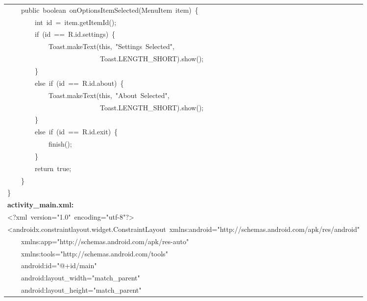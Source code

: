 \documentclass[a4paper,12pt]{article}
\begin{document}
\begin{longtable}{|p{}|}
{\ttfamily\small \ \ \ \ public\ boolean\ onOptionsItemSelected(MenuItem\ item)\ \{} \\
{\ttfamily\small \ \ \ \ \ \ \ \ int\ id\ =\ item.getItemId();} \\
{\ttfamily\small \ \ \ \ \ \ \ \ if\ (id\ ==\ R.id.settings)\ \{} \\
{\ttfamily\small \ \ \ \ \ \ \ \ \ \ \ \ Toast.makeText(this,\ "Settings\ Selected",\ } \\
{\ttfamily\small \ \ \ \ \ \ \ \ \ \ \ \ \ \ \ \ \ \ \ \ \ \ \ \ \ \ \ Toast.LENGTH\_SHORT).show();} \\
{\ttfamily\small \ \ \ \ \ \ \ \ \}} \\
{\ttfamily\small \ \ \ \ \ \ \ \ else\ if\ (id\ ==\ R.id.about)\ \{} \\
{\ttfamily\small \ \ \ \ \ \ \ \ \ \ \ \ Toast.makeText(this,\ "About\ Selected",\ } \\
{\ttfamily\small \ \ \ \ \ \ \ \ \ \ \ \ \ \ \ \ \ \ \ \ \ \ \ \ \ \ \ Toast.LENGTH\_SHORT).show();} \\
{\ttfamily\small \ \ \ \ \ \ \ \ \}} \\
{\ttfamily\small \ \ \ \ \ \ \ \ else\ if\ (id\ ==\ R.id.exit)\ \{} \\
{\ttfamily\small \ \ \ \ \ \ \ \ \ \ \ \ finish();} \\
{\ttfamily\small \ \ \ \ \ \ \ \ \}} \\
{\ttfamily\small \ \ \ \ \ \ \ \ return\ true;} \\
{\ttfamily\small \ \ \ \ \}} \\
{\ttfamily\small \}} \\
\hline
\rule{0pt}{13pt}\textbf{activity\_main.xml:} \\
\hline
{\ttfamily\small \textless{}?xml\ version="1.0"\ encoding="utf-8"?\textgreater{}} \\
{\ttfamily\small \textless{}androidx.constraintlayout.widget.ConstraintLayout\ xmlns:android="http://schemas.android.com/apk/res/android"} \\
{\ttfamily\small \ \ \ \ xmlns:app="http://schemas.android.com/apk/res-auto"} \\
{\ttfamily\small \ \ \ \ xmlns:tools="http://schemas.android.com/tools"} \\
{\ttfamily\small \ \ \ \ android:id="@+id/main"} \\
{\ttfamily\small \ \ \ \ android:layout\_width="match\_parent"} \\
{\ttfamily\small \ \ \ \ android:layout\_height="match\_parent"} \\

\end{longtable}
\end{document}
